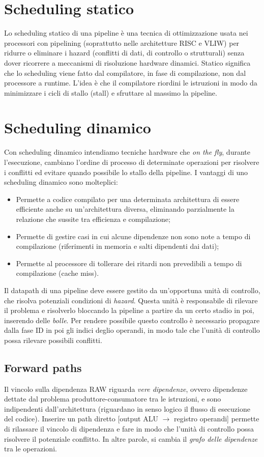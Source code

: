 
\section{Scheduling statico}
Lo scheduling statico di una pipeline è una tecnica di ottimizzazione usata nei processori con pipelining (soprattutto nelle architetture RISC e VLIW) per ridurre o eliminare i hazard (conflitti di dati, di controllo o strutturali) senza dover ricorrere a meccanismi di risoluzione hardware dinamici. Statico significa che lo scheduling viene fatto dal compilatore, in fase di compilazione, non dal processore a runtime. L'idea è che il compilatore riordini le istruzioni in modo da minimizzare i cicli di stallo (stall) e sfruttare al massimo la pipeline.

\section{Scheduling dinamico}
Con scheduling dinamico intendiamo tecniche hardware che \textit{on the fly}, durante l'esecuzione, cambiano l'ordine di processo di determinate operazioni per risolvere i conflitti ed evitare quando possibile lo stallo della pipeline. I vantaggi di uno scheduling dinamico sono molteplici:

\begin{itemize}
    \item Permette a codice compilato per una determinata architettura di essere efficiente anche su un'architettura diversa, eliminando parzialmente la relazione che sussite tra efficienza e compilazione;
    \item Permette di gestire casi in cui alcune dipendenze non sono note a tempo di compilazione (riferimenti in memoria e salti dipendenti dai dati);
    \item Permette al processore di tollerare dei ritardi non prevedibili a tempo di compilazione (cache miss).
\end{itemize}

Il datapath di una pipeline deve essere gestito da un'opportuna unità di controllo, che risolva potenziali condizioni di \textit{hazard}. Questa unità è responsabile di rilevare il problema e risolverlo bloccando la pipeline a partire da un certo stadio in poi, inserendo delle \textit{bolle}. Per rendere possibile questo controllo è necessario propagare dalla fase ID in poi gli indici deglio operandi, in modo tale che l'unità di controllo possa rilevare possibili conflitti. 

\subsection{Forward paths}
Il vincolo sulla dipendenza RAW riguarda \textit{vere dipendenze}, ovvero dipendenze dettate dal problema produttore-consumatore tra le istruzioni, e sono indipendenti dall'architettura (riguardano in senso logico il flusso di esecuzione del codice). Inserire un path diretto [output ALU $\rightarrow$ registro operandi] permette di rilassare il vincolo di dipendenza e fare in modo che l'unità di controllo possa risolvere il potenziale conflitto.  
In altre parole, si cambia il \textit{grafo delle dipendenze} tra le operazioni.

